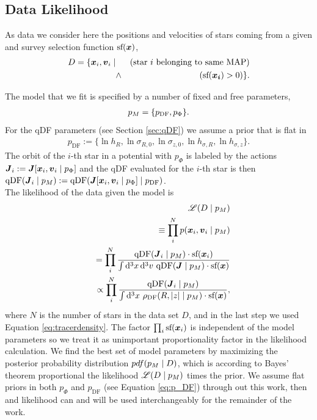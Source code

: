 \subsection{Data Likelihood} \label{sec:likelihood}

As data we consider here the positions and velocities of stars coming from a given \MAP{} and survey selection function $\text{sf}(\boldsymbol{x})$,
\begin{eqnarray*}
D  =\{ \boldsymbol{x}_i,\boldsymbol{v}_i \mid && \text{(star $i$ belonging to same MAP{})}\nonumber\\
&\wedge& (\text{sf}(\boldsymbol{x_i}) > 0) \}.
\end{eqnarray*}

The model that we fit is specified by a number of fixed and free parameters,
\begin{eqnarray*}
p_M =\{ p_\text{DF} , p_\Phi \}.
\end{eqnarray*}
For the qDF parameters (see Section \ref{sec:qDF}) we assume a prior that is flat in
\begin{eqnarray}
p_\text{DF} := \{ \ln h_R, \ln \sigma_{R,0}, \ln \sigma_{z,0}, \ln h_{\sigma,R}, \ln h_{\sigma,z} \}.\label{eq:p_DF}
\end{eqnarray}
The orbit of the $i$-th star in a potential with $p_\Phi$ is labeled by the actions $\boldsymbol{J}_i := \boldsymbol{J}[\boldsymbol{x}_i,\boldsymbol{v}_i\mid p_{\Phi}]$ and the qDF evaluated for the $i$-th star is then $\text{qDF}(\boldsymbol{J}_i \mid p_M) := \text{qDF}(\boldsymbol{J}[\boldsymbol{x}_i,\boldsymbol{v}_i\mid p_{\Phi}] \mid p_\text{DF})$.\\

The likelihood of the data given the model is
\begin{eqnarray}
&&\mathscr{L}(D \mid p_M) \nonumber\\
&&\equiv \prod_i^{N} p(\boldsymbol{x}_i,\boldsymbol{v}_i \mid p_M) \nonumber\\
&&= \prod_i^{N} \frac{\text{qDF}(\boldsymbol{J}_i \mid p_M) \cdot \text{sf}(\boldsymbol{x}_i)}{\int \mathop{}\!\mathrm{d^3} x \mathop{}\!\mathrm{d^3} v \  \text{qDF}(\boldsymbol{J} \mid p_M) \cdot \text{sf}(\boldsymbol{x})}\nonumber\\
&&\propto \prod_i^{N} \frac{\text{qDF}(\boldsymbol{J}_i \mid p_M)}{\int \mathop{}\!\mathrm{d^3} x \  \rho_\text{DF}(R,|z| \mid p_M) \cdot \text{sf}(\boldsymbol{x})}, \label{eq:prob}
\end{eqnarray}
where $N$ is the number of stars in the data set $D$, and in the last step we used Equation \ref{eq:tracerdensity}. The factor $\prod_i\text{sf}(\boldsymbol{x}_i)$ is independent of the model parameters so we treat it as unimportant proportionality factor in the likelihood calculation. We find the best set of model parameters by maximizing the posterior probability distribution $pdf{}(p_M \mid D)$, which is according to Bayes' theorem proportional the likelihood $\mathscr{L}(D\mid p_M)$ times the prior. We assume flat priors in both $p_\Phi$ and $p_\text{DF}$ (see Equation \ref{eq:p_DF}) through out this work, then \pdf{} and likelihood can and will be used interchangeably for the remainder of the work.\\


